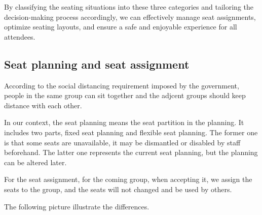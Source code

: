 By classifying the seating situations into these three categories and tailoring the decision-making process accordingly, we can effectively manage seat assignments, optimize seating layouts, and ensure a safe and enjoyable experience for all attendees.

\subsection{Seat planning and seat assignment}
According to the social distancing requirement imposed by the government, people in the same group can sit together and the adjcent groups should keep distance with each other. 


In our context, the seat planning means the seat partition in the planning. It includes two parts, fixed seat planning and flexible seat planning. The former one is that some seats are unavailable, it may be dismantled or disabled by staff beforehand. The latter one represents the current seat planning, but the planning can be altered later.

For the seat assignment, for the coming group, when accepting it, we assign the seats to the group, and the seats will not changed and be used by others.

The following picture illustrate the differences.


\newpage
